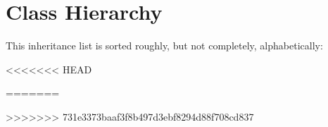 \section{Class Hierarchy}
This inheritance list is sorted roughly, but not completely, alphabetically\+:\begin{DoxyCompactList}
\item {}
\begin{DoxyCompactList}
<<<<<<< HEAD
\item {}
=======
\item {}
>>>>>>> 731e3373baaf3f8b497d3ebf8294d88f708cd837
\end{DoxyCompactList}
\item {}
\end{DoxyCompactList}
